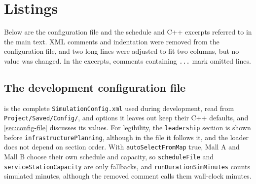 \chapter{Listings}\label{app:listings}
\begingroup\sloppy


Below are the configuration file and the schedule and C++ excerpts referred to in the main text. XML comments and indentation were removed from the configuration file, and two long lines were adjusted to fit two columns, but no value was changed. In the excerpts, comments containing \texttt{...} mark omitted lines.

\section{The development configuration file}\label{app:listings-config}

 is the complete \texttt{SimulationConfig.xml} used during development, read from \texttt{Project/Saved/Config/}, and options it leaves out keep their C++ defaults, and \cref{sec:config-file} discusses its values. For legibility, the \texttt{leadership} section is shown before \texttt{infrastructurePlanning}, although in the file it follows it, and the loader does not depend on section order. With \texttt{autoSelectFromMap} true, Mall A and Mall B choose their own schedule and capacity, so \texttt{scheduleFile} and \texttt{serviceStationCapacity} are only fallbacks, and \texttt{runDurationSimMinutes} counts simulated minutes, although the removed comment calls them wall-clock minutes.

